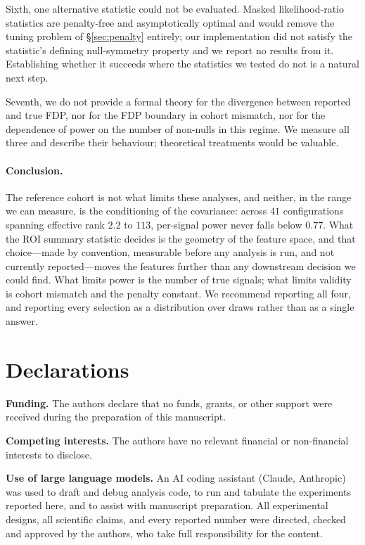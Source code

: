 \documentclass[11pt,a4paper]{article}
\begin{document}
Sixth, one alternative statistic could not be evaluated. Masked
likelihood-ratio statistics \citep{spector2024mlr} are penalty-free and
asymptotically optimal and would remove the tuning problem of
\S\ref{sec:penalty} entirely; our implementation did not satisfy the
statistic's defining null-symmetry property and we report no results from
it. Establishing whether it succeeds where the statistics we tested do not
is a natural next step.

Seventh, we do not provide a formal theory for the divergence between reported
and true FDP, nor for the FDP boundary in cohort mismatch, nor for the
dependence of power on the number of non-nulls in this regime. We measure
all three and describe their behaviour; theoretical treatments would be
valuable.

\paragraph{Conclusion.}
The reference cohort is not what limits these analyses, and neither, in the
range we can measure, is the conditioning of the covariance: across $41$
configurations spanning effective rank $2.2$ to $113$, per-signal power never
falls below $0.77$. What the ROI summary statistic decides is the geometry of
the feature space, and that choice---made by convention, measurable before any
analysis is run, and not currently reported---moves the features further than
any downstream decision we could find. What limits power is the number of
true signals; what limits validity is cohort mismatch and the penalty
constant. We recommend reporting all four, and reporting every selection as a
distribution over draws rather than as a single answer.

\section*{Declarations}

\noindent\textbf{Funding.} \quad The authors declare that no funds, grants,
or other support were received during the preparation of this manuscript.

\medskip
\noindent\textbf{Competing interests.} \quad The authors have no relevant
financial or non-financial interests to disclose.

\medskip
\noindent\textbf{Use of large language models.}  \quad
An AI coding assistant (Claude, Anthropic) was used to draft and debug
analysis code, to run and tabulate the experiments reported here, and to
assist with manuscript preparation. All experimental designs, all
scientific claims, and every reported number were directed, checked and
approved by the authors, who take full responsibility for the content.
\end{document}
